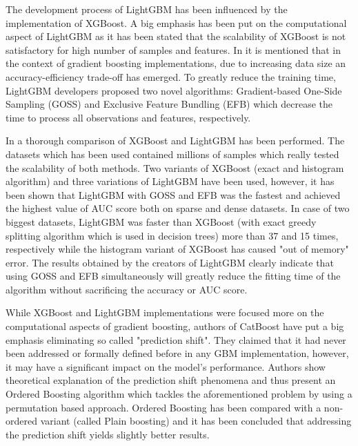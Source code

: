 \documentclass[magisterska, english]{pwr_wmat_praca_dyplomowa}
\theoremstyle{plain}
\numberwithin{theorem}{chapter}
\theoremstyle{definition}
\numberwithin{theorem}{chapter}
\begin{document}
The development process of LightGBM \cite{lightgbm} has been influenced by the implementation of XGBoost. A big emphasis has been put on the computational aspect of LightGBM as it has been stated that the scalability of XGBoost is not satisfactory for high number of samples and features. In \cite{lightgbm} it is mentioned that in the context of gradient boosting implementations, due to increasing data size an accuracy-efficiency trade-off has emerged. To greatly reduce the training time, LightGBM developers proposed two novel algorithms: Gradient-based One-Side Sampling (GOSS) and Exclusive Feature Bundling (EFB) which decrease the time to process all observations and features, respectively.

In \cite{lightgbm} a thorough comparison of XGBoost and LightGBM has been performed. The datasets which has been used contained millions of samples which really tested the scalability of both methods. Two variants of XGBoost (exact and histogram algorithm) and three variations of LightGBM have been used, however, it has been shown that LightGBM with GOSS and EFB was the fastest and achieved the highest value of AUC score both on sparse and dense datasets. In case of two biggest datasets, LightGBM was faster than XGBoost (with exact greedy splitting algorithm which is used in decision trees) more than 37 and 15 times, respectively while the histogram variant of XGBoost has caused "out of memory" error. The results obtained by the creators of LightGBM clearly indicate that using GOSS and EFB simultaneously will greatly reduce the fitting time of the algorithm without sacrificing the accuracy or AUC score.

While XGBoost \cite{xgboost} and LightGBM \cite{lightgbm} implementations were focused more on the computational aspects of gradient boosting, authors of CatBoost \cite{catboost} have put a big emphasis eliminating so called "prediction shift". They claimed that it had never been addressed or formally defined before in any GBM implementation, however, it may have a significant impact on the model's performance. Authors show theoretical explanation of the prediction shift phenomena and thus present an Ordered Boosting algorithm which tackles the aforementioned problem by using a permutation based approach. Ordered Boosting has been compared with a non-ordered variant (called Plain boosting) and it has been concluded that addressing the prediction shift yields slightly better results.
\end{document}
